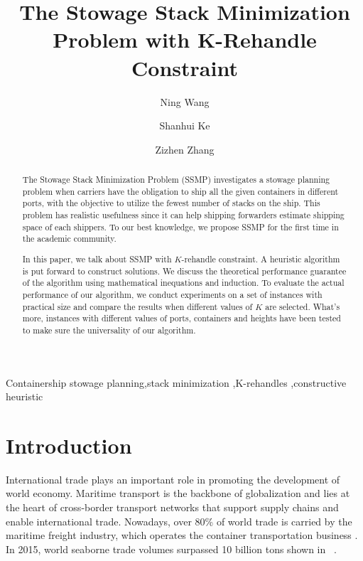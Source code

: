 \documentclass[review,3p,times,authoryear,12pt]{elsarticle}
\begin{document}
\begin{frontmatter}
\newpage

\title{The Stowage Stack Minimization Problem with K-Rehandle Constraint}
\author[shu]{Ning Wang}

\author[shu]{Shanhui Ke}

\author[syu]{Zizhen Zhang}

\address[shu]{
Department of Information Management, School of Management, Shanghai University, Shanghai, China
}
\address[syu]{
School of Data and Computer Science, Sun Yat-Sen University, China
}

\begin{abstract}
The Stowage Stack Minimization Problem (SSMP) investigates a stowage planning problem when carriers have the obligation to ship all the given containers in different ports, with the objective to utilize the fewest number of stacks on the ship. This problem has realistic usefulness since it can help shipping forwarders estimate shipping space of each shippers.
To our best knowledge, we propose SSMP for the first time in the academic community.

In this paper, we talk about SSMP with $K$-rehandle constraint. A heuristic algorithm is put forward to construct solutions. We discuss the theoretical performance guarantee of the algorithm using mathematical inequations and induction.
To evaluate the actual performance of our algorithm, we conduct experiments on a set of instances with practical size and compare the results when different values of $K$ are selected.
What's more, instances with different values of ports, containers and heights have been tested to make sure the universality of our algorithm.
\end{abstract}

\begin{keyword}
Containership stowage planning\sep stack minimization \sep K-rehandles \sep constructive heuristic
\end{keyword}
\end{frontmatter}


\section{Introduction}
\label{sec:i}
International trade plays an important role in promoting the development of world economy.
Maritime transport is the backbone of globalization and lies at the heart of cross-border transport networks that support supply chains and enable international trade.
Nowadays, over 80\% of world trade is carried by the maritime freight industry, which operates the container transportation business \citep{zhang2016multiobjective}.
In 2015, world seaborne trade volumes surpassed 10 billion tons shown in ~\cite{unctad2016}.
\end{document}

